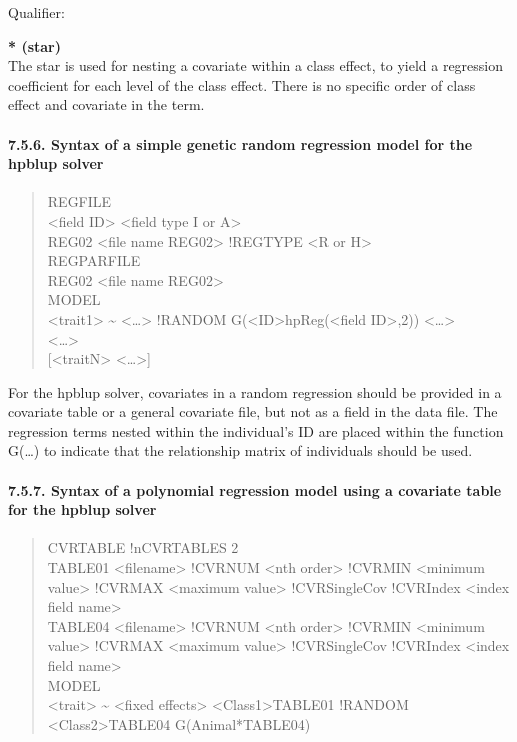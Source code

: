 Qualifier:

\textbf{* (star)}\\
The star is used for nesting a covariate within a class effect, to yield
a regression coefficient for each level of the class effect. There is no
specific order of class effect and covariate in the term.

\paragraph{7.5.6. Syntax of a simple genetic random regression model for
the hpblup solver}\label{Stat26}

\begin{quote}
REGFILE\\
\textless field ID\textgreater{} \textless field type I or
A\textgreater{}\\
REG02 \textless file name REG02\textgreater{} !REGTYPE \textless R or
H\textgreater{}\\
REGPARFILE\\
REG02 \textless file name REG02\textgreater{}\\
MODEL\\
\textless trait1\textgreater{} \textasciitilde{}
\textless\ldots\textgreater{} !RANDOM
G(\textless ID\textgreater*hpReg(\textless field ID\textgreater,2))
\textless\ldots\textgreater{}\\
\textless\ldots\textgreater{}\\
{[}\textless traitN\textgreater{} \textless\ldots\textgreater{]}
\end{quote}

For the hpblup solver, covariates in a random regression should be
provided in a covariate table or a general covariate file, but not as a
field in the data file. The regression terms nested within the
individual's ID are placed within the function G(\ldots) to indicate
that the relationship matrix of individuals should be used.

\paragraph{7.5.7. Syntax of a polynomial regression model using a
covariate table for the hpblup solver}\label{Stat27}

\begin{quote}
CVRTABLE !nCVRTABLES 2\\
TABLE01 \textless filename\textgreater{} !CVRNUM \textless nth
order\textgreater{} !CVRMIN \textless minimum value\textgreater{}
!CVRMAX \textless maximum value\textgreater{} !CVRSingleCov !CVRIndex
\textless index field name\textgreater{}\\
TABLE04 \textless filename\textgreater{} !CVRNUM \textless nth
order\textgreater{} !CVRMIN \textless minimum value\textgreater{}
!CVRMAX \textless maximum value\textgreater{} !CVRSingleCov !CVRIndex
\textless index field name\textgreater{}\\
MODEL\\
\textless trait\textgreater{} \textasciitilde{} \textless fixed
effects\textgreater{} \textless Class1\textgreater*TABLE01 !RANDOM
\textless Class2\textgreater*TABLE04 G(Animal*TABLE04)
\end{quote}

